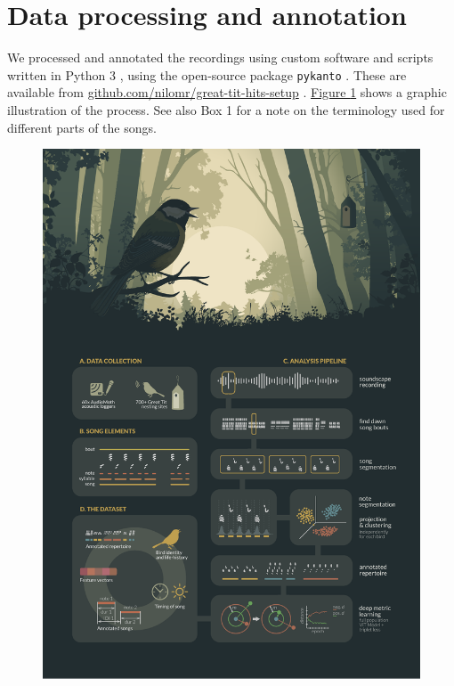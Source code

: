 \section{Data processing and annotation}

We processed and annotated the recordings using custom software and scripts written in Python 3 \parencite{vanrossum1995}, using the open-source package \texttt{pykanto} \parencite{merinorecalde2023}. These are available from \href{https://github.com/nilomr/great-tit-hits-setup}{github.com/nilomr/great-tit-hits-setup} \parencite{nilo_gretidataset_setup_2023}. \hyperref[c3_fig:pipeline]{Figure \ref*{c3_fig:pipeline}} shows a graphic illustration of the process. See also Box 1 for a note on the terminology used for different parts of the songs.


\begin{figure}
    \centering
    \includegraphics[width=\linewidth]{figures/chapter_3/FIG2-AB.pdf}
    \label{c3_fig:pipeline}
\end{figure}


